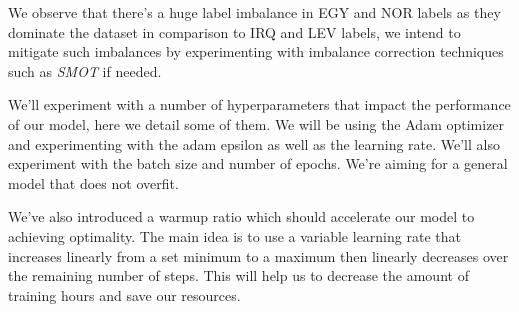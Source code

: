 \documentclass[12pt]{diazessay}
\begin{document}
        We observe that there's a huge label imbalance in EGY and NOR labels as they dominate the dataset in comparison to IRQ and LEV labels, we intend to mitigate such imbalances by experimenting with imbalance correction techniques such as \emph{SMOT} if needed.
        
        We'll experiment with a number of hyperparameters that impact the performance of our model, here we detail some of them. We will be using the Adam optimizer and experimenting with the adam epsilon as well as the learning rate. We'll also experiment with the batch size and number of epochs. We're aiming for a general model that does not overfit.
        
        We've also introduced a warmup ratio which should accelerate our model to achieving optimality. The main idea is to use a variable learning rate that increases linearly from a set minimum to a maximum then linearly decreases over the remaining number of steps. This will help us to decrease the amount of training hours and save our resources.

\newpage
\end{document}
